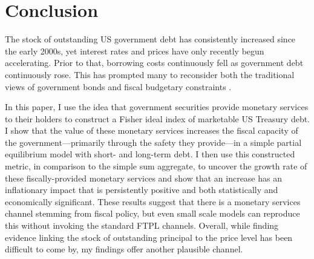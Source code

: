 \documentclass[11pt,a4paper,margin=1.5in]{article}
\begin{document}
\section{Conclusion}
\label{sec:Conclusion}
The stock of outstanding US government debt has consistently increased since the early 2000s, yet interest rates and prices have only recently begun accelerating. 
Prior to that, borrowing costs continuously fell as government debt continuously rose.
This has prompted many to reconsider both the traditional views of government bonds and fiscal budgetary constraints \citep[e.g.][]{Krishnamurthy-VissingJorgensen:2012,Brunnermeier-Merkel-Sannikov:2022}.

In this paper, I use the idea that government securities provide monetary services to their holders to construct a Fisher ideal index of marketable US Treasury debt. 
I show that the value of these monetary services increases the fiscal capacity of the government---primarily through the safety they provide---in a simple partial equilibrium model with short- and long-term debt.
I then use this constructed metric, in comparison to the simple sum aggregate, to uncover the growth rate of these fiscally-provided monetary services and show that an increase has an inflationary impact that is persistently positive and both statistically and economically significant. 
These results suggest that there is a monetary services channel stemming from fiscal policy, but even small scale models can reproduce this without invoking the standard FTPL channels.
Overall, while finding evidence linking the stock of outstanding principal to the price level has been difficult to come by, my findings offer another plausible channel. 
\end{document}

